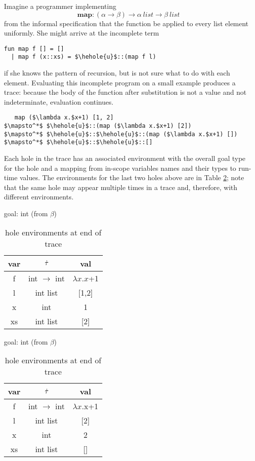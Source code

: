 Imagine a programmer implementing $$\mathbf{map} : (\alpha \to \beta) \to
\alpha ~\mathit{list} \to \beta ~\mathit{list}$$ from the informal
specification that the function be applied to every list element uniformly.
She might arrive at the incomplete term
\begin{lstlisting}
fun map f [] = []
  | map f (x::xs) = $\hehole{u}$::(map f l)
\end{lstlisting}
if she knows the pattern of recursion, but is not sure what to do with each
element. Evaluating this incomplete program on a small example produces a
trace: because the body of the function after substitution is not a value
and not indeterminate, evaluation continues.
\begin{lstlisting}
   map ($\lambda x.$x+1) [1, 2]
$\mapsto^*$ $\hehole{u}$::(map ($\lambda x.$x+1) [2])
$\mapsto^*$ $\hehole{u}$::$\hehole{u}$::(map ($\lambda x.$x+1) [])
$\mapsto^*$ $\hehole{u}$::$\hehole{u}$::[]
\end{lstlisting}
Each hole in the trace has an associated environment with the overall goal
type for the hole and a mapping from in-scope variables names and their
types to run-time values. The environments for the last two holes above are
in Table \ref{tabx}; note that the same hole may appear multiple times in a
trace and, therefore, with different environments.

\begin{table}[h!]
  \begin{subtable}{.5\linewidth}
    \caption{goal: int (from $\beta$)}
    \centering
        {
          \footnotesize
          \begin{tabular}{c|c|c}
            var & $\dot{\tau}$ & val\\
            \hline
            f & int $\to$ int & $\lambda x.x$+1\\
            l & int list & [1,2]\\
            x & int & 1\\
            xs & int list & [2]\\
          \end{tabular}
        }
  \end{subtable}%
  \begin{subtable}{.5\linewidth}
    \caption{goal: int (from $\beta$)}
    \centering
        {
          \footnotesize
          \begin{tabular}{c|c|c}
            var & $\dot{\tau}$ & val\\
            \hline
            f & int $\to$ int & $\lambda x.$x+1\\
            l & int list & [2]\\
            x & int & 2\\
            xs & int list & []\\
          \end{tabular}
        }
  \end{subtable}
  \caption{hole environments at end of trace}
  \label{tabx}
\end{table}

